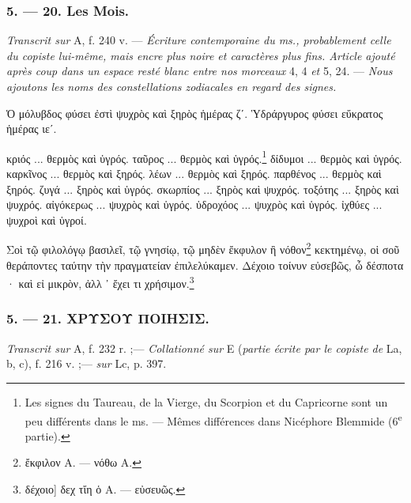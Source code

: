 \documentclass[a4paper, 11pt, oneside, polutonikogreek, french]{article}
\begin{document}
\bigskip
\centerline{\EightStarTaper}
\centerline{\EightStarTaper\EightStarTaper}
\bigskip

\subsubsection{5. --- 20. Les Mois.}

\emph{Transcrit sur} A, f. 240 v. --- \emph{Écriture contemporaine du ms., probablement celle du copiste lui-même, mais encre plus noire et caractères plus fins. Article ajouté après coup dans un espace resté blanc entre nos morceaux} 4, 4 \emph{et} 5, 24. --- \emph{Nous ajoutons les noms des constellations zodiacales en regard des signes.}

\bigskip

Ὁ μόλυβδος φύσει ἐστὶ ψυχρὸς καὶ ξηρὸς ἡμέρας ζʹ. Ὑδράργυρος φύσει εὔκρατος ἡμέρας ιεʹ.

κριός ...  θερμὸς καὶ ὑγρός.  
ταῦρος ... \taurus θερμὸς καὶ ὑγρός.\footnote{Les signes du Taureau, de la Vierge, du Scorpion et du Capricorne sont un peu différents dans le ms. --- Mêmes différences dans Nicéphore Blemmide (6\textsuperscript{e} partie).}  
δίδυμοι ... \gemini θερμὸς καὶ ὑγρός.  
καρκῖνος ... \cancer θερμὸς καὶ ξηρός.  
λέων ... \leo θερμὸς καὶ ξηρός.  
παρθένος ... \scorpio θερμὸς καὶ ξηρός.  
ζυγά ... \libra ξηρὸς καὶ ὑγρός.  
σκωρπίος ... \virgo ξηρὸς καὶ ψυχρός.  
τοξότης ... \sagittarius ξηρὸς καὶ ψυχρός.  
αἰγόκερως ... \capricornus ψυχρὸς καὶ ὑγρός.  
ὑδροχόος ... \aquarius ψυχρὸς καὶ ὑγρός.  
ἰχθύες ... \pisces ψυχροὶ καὶ ὑγροί.  

Σοὶ τῷ φιλολόγῳ βασιλεῖ, τῷ γνησίῳ, τῷ μηδὲν ἔκφυλον ἢ νόθον\footnote{ἔκφιλον A. --- νόθω A.} κεκτημένῳ, οἱ σοῦ θεράποντες ταύτην τὴν πραγματείαν ἐπιλελύκαμεν. Δέχοιο τοίνυν εὐσεβῶς, ὦ δέσποτα · καὶ εἰ μικρὸν, ἀλλ ᾽ ἔχει τι χρήσιμον.\footnote{δέχοιο] δεχ τἴη ὁ A. --- εὐσευῶς.}

\bigskip
\centerline{\EightStarTaper}
\centerline{\EightStarTaper\EightStarTaper}
\bigskip

\subsubsection{5. --- 21. ΧΡΥΣΟΥ ΠΟΙΗΣΙΣ.}

\emph{Transcrit sur} A, f. 232 r. ;--- \emph{Collationné sur} E (\emph{partie écrite par le copiste de} La, b, c), f. 216 v. ;--- \emph{sur} Lc, p. 397.

\bigskip
\end{document}
